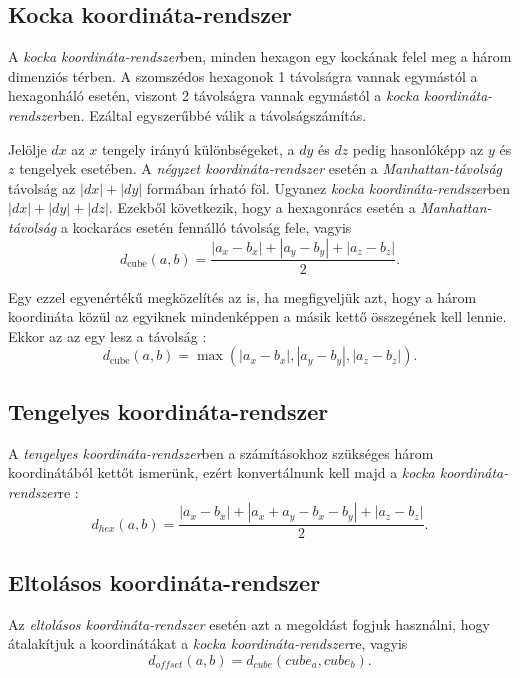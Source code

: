 \subsection{Kocka koordináta-rendszer}

A \textit{kocka koordináta-rendszer}ben, minden hexagon egy kockának felel meg a három dimenziós térben. A szomszédos hexagonok 1 távolságra vannak egymástól a hexagonháló esetén, viszont 2 távolságra vannak egymástól a \textit{kocka koordináta-rendszer}ben. Ezáltal egyszerűbbé válik a távolságszámítás.

Jelölje $dx$ az $x$ tengely irányú különbségeket, a $dy$ és $dz$ pedig hasonlóképp az $y$ és $z$ tengelyek esetében. A \textit{négyzet koordináta-rendszer} esetén a \textit{Manhattan-távolság} távolság az $|dx| + |dy|$ formában írható föl. Ugyanez \textit{kocka koordináta-rendszer}ben $|dx| + |dy| + |dz|$. Ezekből következik, hogy a hexagonrács esetén a \textit{Manhattan-távolság} a kockarács esetén fennálló távolság fele, vagyis
$$
d_{\text{cube}}(a, b) =
\dfrac{|a_x - b_x| + |a_y - b_y| + |a_z - b_z|}{2}.
$$

Egy ezzel egyenértékű megközelítés az is, ha megfigyeljük azt, hogy a három koordináta közül az egyiknek mindenképpen a másik kettő összegének kell lennie. Ekkor az az egy lesz a távolság \cite{Distance_Cube}:
$$
d_{\text{cube}}(a, b) =
\max(
|a_x - b_x|, |a_y - b_y|, |a_z - b_z|
).
$$

\subsection{Tengelyes koordináta-rendszer}

A \textit{tengelyes koordináta-rendszer}ben a számításokhoz szükséges három koordinátából kettőt ismerünk, ezért konvertálnunk kell majd a \textit{kocka koordináta-rendszer}re \cite{Distance_Axial}:
$$
d_{hex}(a, b) = \frac{|a_x - b_x| + |a_x + a_y - b_x - b_y| + |a_z - b_z|}{2}.
$$

\subsection{Eltolásos koordináta-rendszer}

Az \textit{eltolásos koordináta-rendszer} esetén azt a megoldást fogjuk használni, hogy átalakítjuk a koordinátákat a \textit{kocka koordináta-rendszer}re, vagyis \cite{Distance_Offset}
$$
d_{of\!fset} (a, b) = d_{cube}(cube_a, cube_b).
$$

